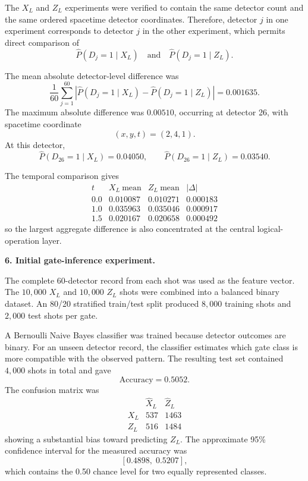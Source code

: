 \documentclass[10pt,a4paper]{article}
\begin{document}
The \(X_L\) and \(Z_L\) experiments were verified to contain the same detector
count and the same ordered spacetime detector coordinates. Therefore, detector
\(j\) in one experiment corresponds to detector \(j\) in the other experiment,
which permits direct comparison of
\[
\widehat{P}(D_j=1\mid X_L)
\quad\text{and}\quad
\widehat{P}(D_j=1\mid Z_L).
\]

The mean absolute detector-level difference was
\[
\frac{1}{60}\sum_{j=1}^{60}
\left|
\widehat{P}(D_j=1\mid X_L)
-
\widehat{P}(D_j=1\mid Z_L)
\right|
=0.001635.
\]
The maximum absolute difference was \(0.00510\), occurring at detector 26,
with spacetime coordinate
\[
(x,y,t)=(2,4,1).
\]
At this detector,
\[
\widehat{P}(D_{26}=1\mid X_L)=0.04050,
\qquad
\widehat{P}(D_{26}=1\mid Z_L)=0.03540.
\]

The temporal comparison gives
\[
\begin{array}{c|ccc}
t & X_L\ \mathrm{mean} & Z_L\ \mathrm{mean} & |\Delta|\\
\hline
0.0 & 0.010087 & 0.010271 & 0.000183\\
1.0 & 0.035963 & 0.035046 & 0.000917\\
1.5 & 0.020167 & 0.020658 & 0.000492
\end{array}
\]
so the largest aggregate difference is also concentrated at the central
logical-operation layer.

\textbf{6. Initial gate-inference experiment.}

The complete 60-detector record from each shot was used as the feature vector.
The \(10{,}000\) \(X_L\) and \(10{,}000\) \(Z_L\) shots were combined into a
balanced binary dataset. An 80/20 stratified train/test split produced
\(8{,}000\) training shots and \(2{,}000\) test shots per gate.

A Bernoulli Naive Bayes classifier was trained because detector outcomes are
binary. For an unseen detector record, the classifier estimates which gate class
is more compatible with the observed pattern. The resulting test set contained
\(4{,}000\) shots in total and gave
\[
\mathrm{Accuracy}=0.5052.
\]
The confusion matrix was
\[
\begin{array}{c|cc}
 & \widehat{X}_L & \widehat{Z}_L\\
\hline
X_L & 537 & 1463\\
Z_L & 516 & 1484
\end{array}
\]
showing a substantial bias toward predicting \(Z_L\). The approximate 95\%
confidence interval for the measured accuracy was
\[
[0.4898,\;0.5207],
\]
which contains the 0.50 chance level for two equally represented classes.
\end{document}
